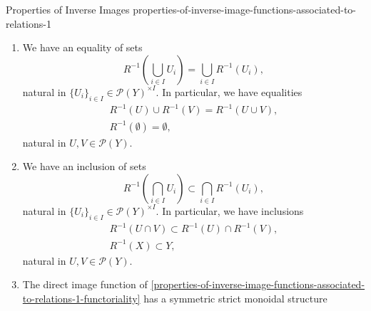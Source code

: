 \begin{proposition}{Properties of Inverse Images \rmI}{properties-of-inverse-image-functions-associated-to-relations-1}
\begin{enumerate}
\[\begin{tikzcd}[row sep={5.0*\the\DL,between origins}, column sep={11.5*\the\DL,between origins}, background color=backgroundColor, ampersand replacement=\&]
                    {\mathcal{P}(X)^{\op}\times\mathcal{P}(X)}
                    \arrow[r,"R^{\op}_{-1}\times R^{-1}"]
                    \arrow[d,"{[-_{1},-_{2}]_{X}}"']
                    \&
                    {\mathcal{P}(Y)^{\op}\times\mathcal{P}(Y)}
                    \arrow[d,"{[-_{1},-_{2}]_{Y}}"]
                    \\
                    {\mathcal{P}(X)}
                    \arrow[r,"R^{-1}"']
                    \&
                    \mathcal{P}(Y)
                \end{tikzcd}
            \]%
            commutes, i.e.\ we have an equality of sets
            \[
                R^{-1}([U,V]_{X})%
                =%
                [R_{-1}(U),R^{-1}(V)]_{Y},%
            \]%
            natural in $U,V\in\mathcal{P}(X)$.
        \item\label{properties-of-inverse-image-functions-associated-to-relations-1-preservation-of-colimits}We have an equality of sets
            \[
                R^{-1}\left(\bigcup_{i\in I}U_{i}\right)%
                =%
                \bigcup_{i\in I}R^{-1}(U_{i}),%
            \]%
            natural in $\{U_{i}\}_{i\in I}\in\mathcal{P}(Y)^{\times I}$. In particular, we have equalities%
            \[
                \begin{gathered}
                    R^{-1}(U)\cup R^{-1}(V) = R^{-1}(U\cup V),\\
                    R^{-1}(\emptyset)       = \emptyset,
                \end{gathered}
            \]%
            natural in $U,V\in\mathcal{P}(Y)$.
        \item\label{properties-of-inverse-image-functions-associated-to-relations-1-oplax-preservation-of-limits}We have an inclusion of sets
            \[
                R^{-1}\left(\bigcap_{i\in I}U_{i}\right)%
                \subset%
                \bigcap_{i\in I}R^{-1}(U_{i}),%
            \]%
            natural in $\{U_{i}\}_{i\in I}\in\mathcal{P}(Y)^{\times I}$. In particular, we have inclusions%
            \[
                \begin{gathered}
                    R^{-1}(U\cap V) \subset R^{-1}(U)\cap R^{-1}(V),\\
                    R^{-1}(X)       \subset Y,
                \end{gathered}
            \]%
            natural in $U,V\in\mathcal{P}(Y)$.
        \item\label{properties-of-inverse-image-functions-associated-to-relations-1-symmetric-strict-monoidality-with-respect-to-unions}The direct image function of \cref{properties-of-inverse-image-functions-associated-to-relations-1-functoriality} has a symmetric strict monoidal structure

\end{enumerate}
\end{proposition}
